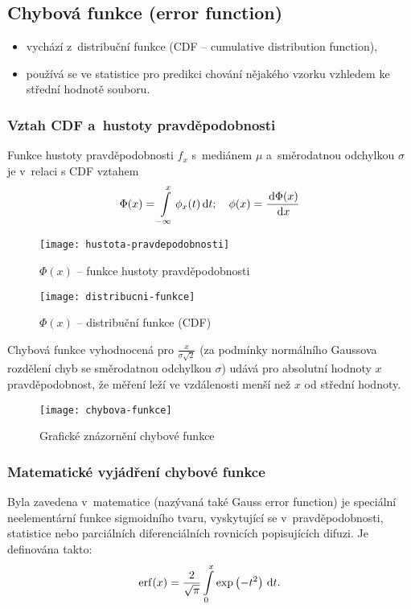 
\subsection{Chybová funkce (error function)}\label{sec:chybova-funkce}
\begin{itemize}
	\item vychází z~distribuční funkce (CDF -- cumulative distribution function),
	\item používá se ve statistice pro predikci chování nějakého vzorku vzhledem ke střední hodnotě souboru.
\end{itemize}

\subsubsection{Vztah CDF a~hustoty pravděpodobnosti}
Funkce hustoty pravděpodobnosti $f_x$ s~mediánem $\mu$ a~směrodatnou odchylkou $\sigma$ je v~relaci s CDF vztahem
\begin{equation}
	\Phi(x) = \int\limits_{-\infty}^x \phi_x(t) \,\mathrm{d} t; \quad
	\phi(x) = \frac{\,\mathrm{d} \Phi(x)}{\,\mathrm{d} x}
\end{equation}

\begin{figure}[H]
	\centering
	\texttt{[image: hustota-pravdepodobnosti]}
	\caption{$\Phi(x)$ -- funkce hustoty pravděpodobnosti}
	\label{fig:hustota-pravdepodobnosti}
\end{figure}

\begin{figure}[H]
	\centering
	\texttt{[image: distribucni-funkce]}
	\caption{$\Phi(x)$ -- distribuční funkce (CDF)}
	\label{fig:distribucni-funkce}
\end{figure}

Chybová funkce vyhodnocená pro $\tfrac{x}{\sigma \sqrt{2}}$ (za podmínky normálního Gaussova rozdělení chyb se směrodatnou odchylkou $\sigma$) udává pro absolutní hodnoty $x$ pravděpodobnost, že měření leží ve vzdálenosti menší než $x$ od střední hodnoty.
\begin{figure}[H]
	\centering
	\texttt{[image: chybova-funkce]}
	\caption{Grafické znázornění chybové funkce}
	\label{fig:chybova-funkce}
\end{figure}

\subsubsection{Matematické vyjádření chybové funkce}
Byla zavedena v~matematice (nazývaná také Gauss error function) je speciální neelementární funkce sigmoidního tvaru, vyskytující se v~pravděpodobnosti, statistice nebo parciálních diferenciálních rovnicích popisujících difuzi.
Je definována takto:
\begin{equation}
	\mathrm{erf}(x) = \frac{2}{\sqrt{\pi}} \int\limits_0^x \exp\left(-t^2\right) \,\mathrm{d} t.
\end{equation}

